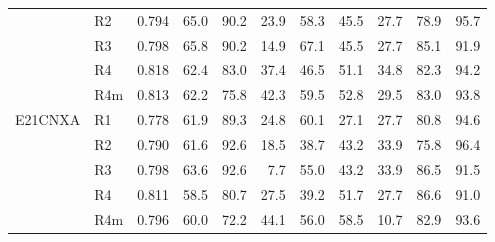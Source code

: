 \begin{table}[h]
\begin{tabular}{@{}llrrrrrrrrr@{}}
 & R2 & 0.794 & 65.0 & 90.2 & 23.9 & 58.3 & 45.5 & 27.7 & 78.9 & 95.7 \\
 & R3 & 0.798 & 65.8 & 90.2 & 14.9 & 67.1 & 45.5 & 27.7 & 85.1 & 91.9 \\
 & R4 & 0.818 & 62.4 & 83.0 & 37.4 & 46.5 & 51.1 & 34.8 & 82.3 & 94.2 \\
 & R4m & 0.813 & 62.2 & 75.8 & 42.3 & 59.5 & 52.8 & 29.5 & 83.0 & 93.8 \\
\addlinespace
E21CNXA & R1 & 0.778 & 61.9 & 89.3 & 24.8 & 60.1 & 27.1 & 27.7 & 80.8 & 94.6 \\
 & R2 & 0.790 & 61.6 & 92.6 & 18.5 & 38.7 & 43.2 & 33.9 & 75.8 & 96.4 \\
 & R3 & 0.798 & 63.6 & 92.6 & 7.7 & 55.0 & 43.2 & 33.9 & 86.5 & 91.5 \\
 & R4 & 0.811 & 58.5 & 80.7 & 27.5 & 39.2 & 51.7 & 27.7 & 86.6 & 91.0 \\
 & R4m & 0.796 & 60.0 & 72.2 & 44.1 & 56.0 & 58.5 & 10.7 & 82.9 & 93.6 \\
\bottomrule
\end{tabular}
\end{table}
